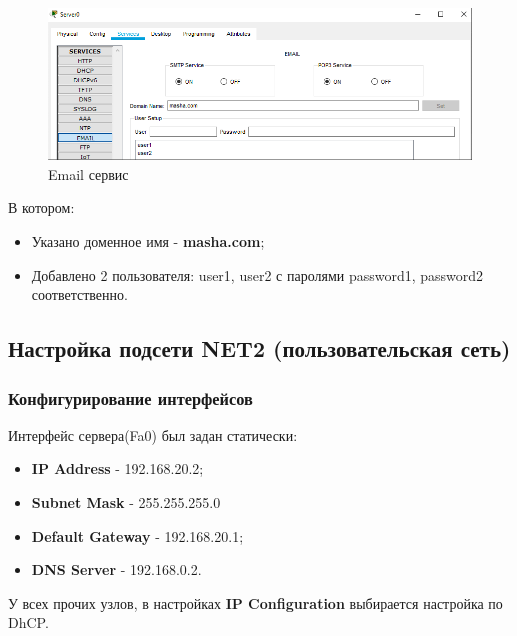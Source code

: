\documentclass[14pt,a4paper,report]{report}
\begin{document}
\begin{figure}[h]
  \centering
  \includegraphics[width=.8\textwidth]{img/4}
  \caption{Email сервис}
\end{figure}


В котором:
\begin{itemize}
\item Указано доменное имя - \textbf{masha.com};
\item Добавлено 2 пользователя: user1, user2 с паролями password1, password2 соответственно.
\end{itemize}


\subsection{Настройка подсети NET2 (пользовательская сеть)}
\subsubsection{Конфигурирование интерфейсов}
Интерфейс сервера(Fa0) был задан статически:
\begin{itemize}
\item \textbf{IP Address} - 192.168.20.2;
\item \textbf{Subnet Mask} - 255.255.255.0
\item \textbf{Default Gateway} - 192.168.20.1;
\item \textbf{DNS Server} - 192.168.0.2.
\end{itemize}
У всех прочих узлов, в настройках \textbf{IP Configuration} выбирается настройка по DhCP.
\end{document}
